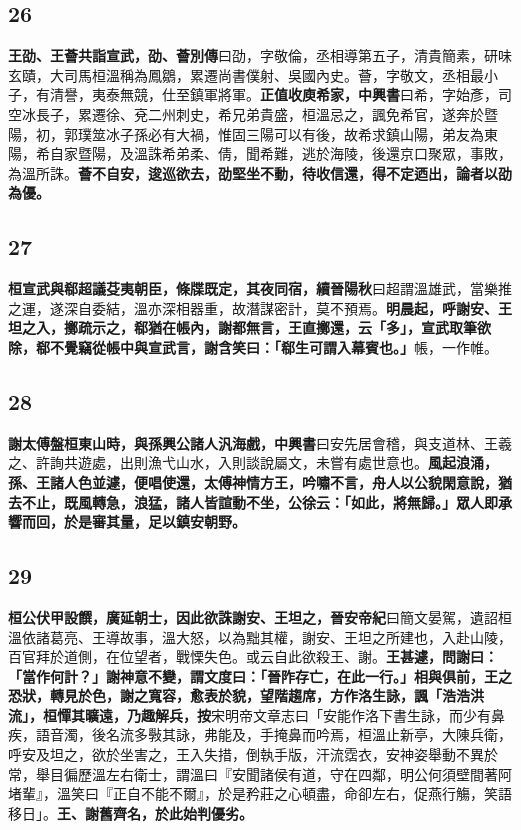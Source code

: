 \subsection*{26}

\textbf{王劭、王薈共詣宣武，}{\footnotesize \textbf{劭、薈別傳}曰劭，字敬倫，丞相導第五子，清貴簡素，研味玄賾，大司馬桓溫稱為鳳鶵，累遷尚書僕射、吳國內史。薈，字敬文，丞相最小子，有清譽，夷泰無競，仕至鎮軍將軍。}\textbf{正值收庾希家，}{\footnotesize \textbf{中興書}曰希，字始彥，司空冰長子，累遷徐、兗二州刺史，希兄弟貴盛，桓溫忌之，諷免希官，遂奔於暨陽，初，郭璞筮冰子孫必有大禍，惟固三陽可以有後，故希求鎮山陽，弟友為東陽，希自家暨陽，及溫誅希弟柔、倩，聞希難，逃於海陵，後還京口聚眾，事敗，為溫所誅。}\textbf{薈不自安，逡巡欲去，劭堅坐不動，待收信還，得不定迺出，論者以劭為優。}

\subsection*{27}

\textbf{桓宣武與郗超議芟夷朝臣，條牒既定，其夜同宿，}{\footnotesize \textbf{續晉陽秋}曰超謂溫雄武，當樂推之運，遂深自委結，溫亦深相器重，故潛謀密計，莫不預焉。}\textbf{明晨起，呼謝安、王坦之入，擲疏示之，郗猶在帳內，謝都無言，王直擲還，云「多」，宣武取筆欲除，郗不覺竊從帳中與宣武言，謝含笑曰：「郗生可謂入幕賓也。」}{\footnotesize 帳，一作帷。}

\subsection*{28}

\textbf{謝太傅盤桓東山時，與孫興公諸人汎海戲，}{\footnotesize \textbf{中興書}曰安先居會稽，與支道林、王羲之、許詢共遊處，出則漁弋山水，入則談說屬文，未嘗有處世意也。}\textbf{風起浪涌，孫、王諸人色並遽，便唱使還，太傅神情方王，吟嘯不言，舟人以公貌閑意說，猶去不止，既風轉急，浪猛，諸人皆諠動不坐，公徐云：「如此，將無歸。」眾人即承響而回，於是審其量，足以鎮安朝野。}

\subsection*{29}

\textbf{桓公伏甲設饌，廣延朝士，因此欲誅謝安、王坦之，}{\footnotesize \textbf{晉安帝紀}曰簡文晏駕，遺詔桓溫依諸葛亮、王導故事，溫大怒，以為黜其權，謝安、王坦之所建也，入赴山陵，百官拜於道側，在位望者，戰慄失色。或云自此欲殺王、謝。}\textbf{王甚遽，問謝曰：「當作何計？」謝神意不變，謂文度曰：「晉阼存亡，在此一行。」相與俱前，王之恐狀，轉見於色，謝之寬容，愈表於貌，望階趨席，方作洛生詠，諷「浩浩洪流」，桓憚其曠遠，乃趣解兵，}{\footnotesize \textbf{按}宋明帝文章志曰「安能作洛下書生詠，而少有鼻疾，語音濁，後名流多斅其詠，弗能及，手掩鼻而吟焉，桓溫止新亭，大陳兵衛，呼安及坦之，欲於坐害之，王入失措，倒執手版，汗流霑衣，安神姿舉動不異於常，舉目徧歷溫左右衛士，謂溫曰『安聞諸侯有道，守在四鄰，明公何須壁間著阿堵輩』，溫笑曰『正自不能不爾』，於是矜莊之心頓盡，命卻左右，促燕行觴，笑語移日」。}\textbf{王、謝舊齊名，於此始判優劣。}

